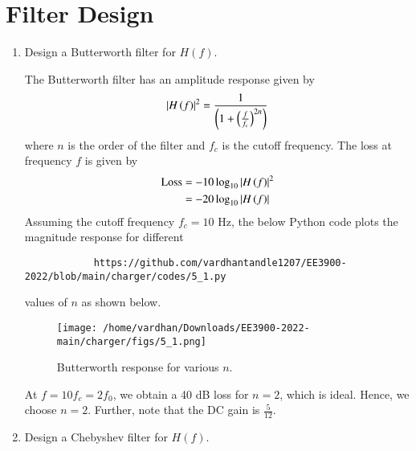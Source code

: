 \documentclass[journal,12pt,twocolumn]{IEEEtran}
\renewcommand\thesection{\arabic{section}}
\begin{document}
	\section{Filter Design}
	\begin{enumerate}[label=\thesection.\arabic*
		,ref=\thesection.\theenumi]
		\item Design a Butterworth filter for $H(f)$.
		
		\solution The Butterworth filter has an amplitude response
		given by
		\begin{align}
			\left\vert H\left(f\right)\right\vert^2 = \frac{1}{\left(1 + \left(\frac{f}{f_c}\right)^{2n}\right)}
		\end{align}
		where $n$ is the order of the filter and $f_c$ is the cutoff
		frequency. The loss at frequency $f$ is given by 
		\begin{align}
			\text{Loss} &= -10\log_{10}\left\vert H\left(f\right)\right\vert^2 \\
			&= -20\log_{10}\left\vert H\left(f\right)\right\vert
		\end{align}
		Assuming the cutoff frequency $f_c = 10$ Hz, the below Python code plots the magnitude response for different 
		\begin{lstlisting}
			https://github.com/vardhantandle1207/EE3900-2022/blob/main/charger/codes/5_1.py
		\end{lstlisting}
		values of $n$ as shown below.
		\begin{figure}[!ht]
			\texttt{[image: /home/vardhan/Downloads/EE3900-2022-main/charger/figs/5\_1.png]}
			\caption{Butterworth response for various $n$.}
			\label{fig:butter-resp}
		\end{figure}
		At $f = 10f_c = 2f_0$, we obtain a 40 dB loss for $n = 2$, which is
		ideal. Hence, we choose $n = 2$. Further, note that the
		DC gain is $\frac{5}{12}$.
		
		\item Design a Chebyshev filter for $H(f)$.
		

\end{enumerate}
\end{document}

